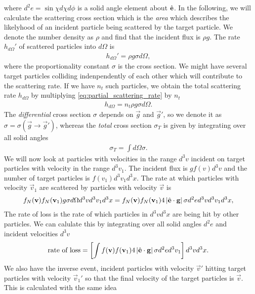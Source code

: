 where $d^2e = \sin\chi d\chi d\phi$ is a solid angle element about $\hat {\mathbf{e}}$. In the following, we will calculate the scattering cross section which is the \textit{area} which describes the likelyhood of an incident particle being scattered by the target particle. We denote the number density as $\rho$ and find that the incident flux is $\rho g$. The rate $h_{d\Omega}'$ of scattered particles into $d\Omega$ is
\begin{align}
	\label{eq:partial_scattering_rate}
	h_{d\Omega}' = \rho g\sigma d\Omega,
\end{align}
where the proportionality constant $\sigma$ is the cross section. We might have several target particles colliding indenpendently of each other which will contribute to the scattering rate. If we have $n_t$ such particles, we obtain the total scattering rate $h_{d\Omega}$ by multiplying \eqref{eq:partial_scattering_rate} by $n_t$
\begin{align}
	h_{d\Omega} = n_t\rho g\sigma d\Omega.
\end{align}
The \textit{differential} cross section $\sigma$ depends on $\vec g$ and $\vec g'$, so we denote it as $\sigma = \sigma(\vec g\rightarrow \vec g')$, whereas the \textit{total} cross section $\sigma_T$ is given by integrating over all solid angles
\begin{align}
	\sigma_T = \int d\Omega \sigma.
\end{align}
We will now look at particles with velocities in the range $d^3 v$ incident on target particles with velocity in the range $d^3 v_1$. The incident flux is $gf(v)d^3v$ and the number of target particles is $f(v_1)d^3v_1d^3x$. The rate at which particles with velocity $\vec v_1$ are scattered by particles with velocity $\vec v$ is 
\begin{align}
	f_N(\mathbf v)f_N(\mathbf v_1) g \sigma d\Omega d^3v d^3v_1 d^3 x = f_N(\mathbf v)f_N(\mathbf v_1)4\left|\hat {\mathbf{e}}\cdot \mathbf g\right| \sigma d^2e d^3v d^3v_1 d^3 x,
\end{align}
The rate of loss is the rate of which particles in $d^3vd^3x$ are being hit by other particles. We can calulate this by integrating over all solid angles $d^2 e$ and incident velocities $d^3 v$
\begin{align}
	\text{rate of loss} = \left[\int f(\mathbf v)f(\mathbf v_1)4\left|\hat {\mathbf{e}} \cdot \mathbf g \right|\sigma d^2 ed^3 v_1\right]d^3 vd^3 x.
\end{align}
We also have the inverse event, incident particles with velocity $\vec v'$ hitting target particles with velocity $\vec v_1'$ so that the final velocity of the target particles is $\vec v$. This is calculated with the same idea
